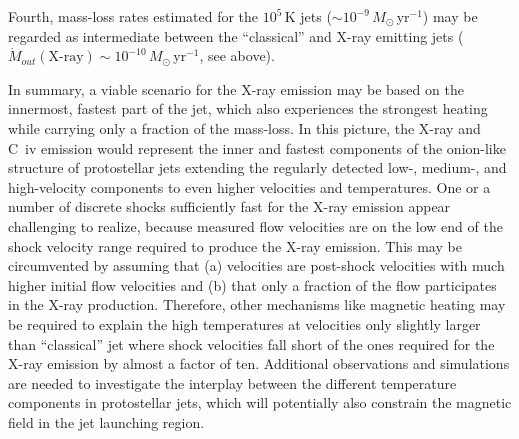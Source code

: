 Fourth, mass-loss rates estimated for the $10^5$\,K jets ($\sim10^{-9}\,M_\odot$\,yr$^{-1}$) may be regarded as intermediate between the ``classical'' \citep[$\sim10^{-8}\,M_\odot$\,yr$^{-1}$][]{} and X-ray emitting jets ($\dot{M}_{out}(\textrm{X-ray})\sim10^{-10}\,M_\odot$\,yr$^{-1}$, see above). 


In summary, a viable scenario for the X-ray emission may be based on the innermost, fastest part of the jet, which also experiences the strongest heating while carrying only a fraction of the mass-loss. In this picture, the X-ray and C~{\sc iv} emission would represent the inner and fastest components of the onion-like structure of protostellar jets extending the regularly detected low-, medium-, and high-velocity components to even higher velocities and temperatures. One or a number of discrete shocks sufficiently fast for the X-ray emission appear challenging to realize, because measured flow velocities are on the low end of the shock velocity range required to produce the X-ray emission. This  may be circumvented by assuming that (a) velocities are post-shock velocities with much higher initial flow velocities and (b) that only a fraction of the flow participates in the X-ray production. Therefore, other mechanisms like magnetic heating may be required to explain the high temperatures at velocities only slightly larger than ``classical'' jet where shock velocities fall short of the ones required for the X-ray emission by almost a factor of ten. Additional observations and simulations are needed to investigate the interplay between the different temperature components in protostellar jets, which will potentially also constrain the magnetic field in the jet launching region.





